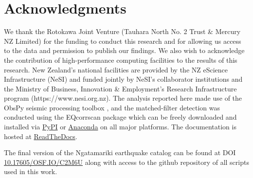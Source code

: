 \section{Acknowledgments}
We thank the Rotokawa Joint Venture (Tauhara North No. 2 Trust \& Mercury NZ Limited) for the funding to conduct this research and for allowing us access to the data and permission to publish our findings. We also wish to acknowledge the contribution of high-performance computing facilities to the results of this research. New Zealand's national facilities are provided by the NZ eScience Infrastructure (NeSI) and funded jointly by NeSI's collaborator institutions and the Ministry of Business, Innovation \& Employment's Research Infrastructure program (https://www.nesi.org.nz). The analysis reported here made use of the ObsPy seismic processing toolbox \citep{obspy_doi}, and the matched-filter detection was conducted using the EQcorrscan package \citep{Chamberlain_2017, eqcorrscan_doi} which can be freely downloaded and installed via \href{https://pypi.python.org/pypi/EQcorrscan}{PyPI} or \href{https://anaconda.org/conda-forge/eqcorrscan}{Anaconda} on all major platforms. The documentation is hosted at \href{http://eqcorrscan.readthedocs.io/en/latest/}{ReadTheDocs}.

The final version of the Ngatamariki earthquake catalog can be found at DOI \href{10.17605/OSF.IO/C2M6U}{10.17605/OSF.IO/C2M6U} along with access to the github repository of all scripts used in this work.
